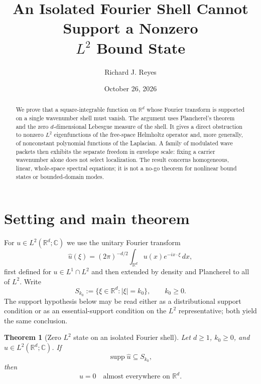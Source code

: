 \documentclass[11pt]{article}
\title{An Isolated Fourier Shell Cannot Support a Nonzero\\
\texorpdfstring{$L^2$}{L2} Bound State}
\author{Richard J. Reyes}
\date{October 26, 2026}
\newtheorem{theorem}{Theorem}
\theoremstyle{remark}
\newcommand{\R}{\mathbb{R}}
\newcommand{\C}{\mathbb{C}}
\newcommand{\supp}{\operatorname{supp}}
\begin{document}
\maketitle

\begin{abstract}
We prove that a square-integrable function on $\R^d$ whose Fourier
transform is supported on a single wavenumber shell must vanish.  The
argument uses Plancherel's theorem and the zero $d$-dimensional Lebesgue
measure of the shell.  It gives a direct obstruction to nonzero
$L^2$ eigenfunctions of the free-space Helmholtz operator and, more
generally, of nonconstant polynomial functions of the Laplacian.  A
family of modulated wave packets then exhibits the separate freedom
in envelope scale: fixing a carrier wavenumber alone does not select
localization.  The result concerns homogeneous, linear, whole-space
spectral equations; it is not a no-go theorem for nonlinear bound
states or bounded-domain modes.
\end{abstract}

\section{Setting and main theorem}
For $u\in L^2(\R^d;\C)$ we use the unitary Fourier transform
\begin{equation}
 \widehat{u}(\xi)=(2\pi)^{-d/2}
 \int_{\R^d}u(x)e^{-ix\cdot\xi}\,dx,
 \label{eq:Fourier}
\end{equation}
first defined for $u\in L^1\cap L^2$ and then extended by density
and Plancherel to all of $L^2$.  Write
\begin{equation}
 S_{k_0}:=\{\xi\in\R^d:|\xi|=k_0\},\qquad k_0\geq 0.
 \label{eq:shell}
\end{equation}
The support hypothesis below may be read either as a distributional
support condition or as an essential-support condition on the $L^2$
representative; both yield the same conclusion.

\begin{theorem}[Zero $L^2$ state on an isolated Fourier shell]
\label{thm:shell}
Let $d\geq1$, $k_0\geq0$, and $u\in L^2(\R^d;\C)$.  If
\begin{equation}
 \supp\widehat u\subseteq S_{k_0},
 \label{eq:support}
\end{equation}
then
\begin{equation}
 \boxed{u=0\quad\text{almost everywhere on }\R^d.}
 \label{eq:main}
\end{equation}
\end{theorem}
\end{document}
